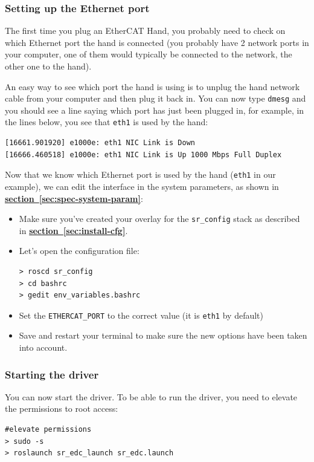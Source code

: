 \documentclass[12pt]{article}
\newcommand{\link}[1]{\hyperref[sec:#1]{\textbf{section~\ref*{sec:#1}}}}
\begin{document}
\subsubsection{Setting up the Ethernet port}
\par The first time you plug an EtherCAT Hand, you probably need to check on which Ethernet port the hand is connected (you probably have 2 network ports in your computer, one of them would typically be connected to the network, the other one to the hand).\\

\par An easy way to see which port the hand is using is to unplug the hand network cable from your computer and then plug it back in. You can now type \texttt{dmesg} and you should see a line saying which port has just been plugged in, for example, in the lines below, you see that \texttt{eth1} is used by the hand:
  \begin{lstlisting}[escapeinside='']
[16661.901920] e1000e: eth1 NIC Link is Down
[16666.460518] e1000e: eth1 NIC Link is Up 1000 Mbps Full Duplex
  \end{lstlisting}

\par Now that we know which Ethernet port is used by the hand (\texttt{eth1} in our example), we can edit the interface in the system parameters, as shown in \link{spec-system-param}:
\begin{itemize}
\item Make sure you've created your overlay for the \texttt{sr\_config} stack as described in \link{install-cfg}.
\item Let's open the configuration file:
  \begin{lstlisting}[escapeinside='']
> roscd sr_config
> cd bashrc
> gedit env_variables.bashrc
  \end{lstlisting}
\item Set the \texttt{ETHERCAT\_PORT} to the correct value (it is \texttt{eth1} by default)
\item Save and restart your terminal to make sure the new options have been taken into account.
\end{itemize}

\subsubsection{Starting the driver}
\par You can now start the driver. To be able to run the driver, you need to elevate the permissions to root access:
  \begin{lstlisting}[escapeinside='']
#elevate permissions
> sudo -s
> roslaunch sr_edc_launch sr_edc.launch
  \end{lstlisting}
\end{document}
